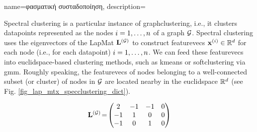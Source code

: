 {name={\foreignlanguage{greek}{φασματική συσταδοποίηση}},
	description={Spectral \gls{clustering} is a particular instance of 
		\gls{graphclustering}, i.e., it clusters \gls{datapoint}s 
		represented as the nodes $i=1,\ldots,n$ of a \gls{graph} $\mathcal{G}$. 
		Spectral \gls{clustering} uses the \gls{eigenvector}s of the \gls{LapMat} ${\bf L}^{(\mathcal{G})}$ 
		to construct \gls{featurevec}s ${\bf x}^{(i)} \in \mathbb{R}^{d}$ 
		for each node (i.e., for each \gls{datapoint}) $i=1,\ldots,n$. We can feed these \gls{featurevec}s 
		into \gls{euclidspace}-based \gls{clustering} methods, such as \gls{kmeans} 
		or \gls{softclustering} via \gls{gmm}. Roughly speaking, the \gls{featurevec}s of nodes 
		belonging to a well-connected subset (or \gls{cluster}) of nodes in $\mathcal{G}$ are located 
		nearby in the \gls{euclidspace} $\mathbb{R}^{d}$ (see Fig. \ref{fig_lap_mtx_specclustering_dict}). 
		\begin{figure}[H]
			\begin{center}
				\begin{minipage}{0.4\textwidth}
				\end{minipage} 
				\hspace*{5mm}
				\begin{minipage}{0.4\textwidth}
					\begin{equation} 
						{\bf L}^{(\mathcal{G})}\!=\!
						\begin{pmatrix} 
							2 & -1 & -1 & 0 \\ 
							-1 & 1 & 0 & 0 \\  
							-1 & 0 & 1 & 0 \\ 

\end{pmatrix}
\end{equation}
\end{minipage}
\end{center}
\end{figure}}}
